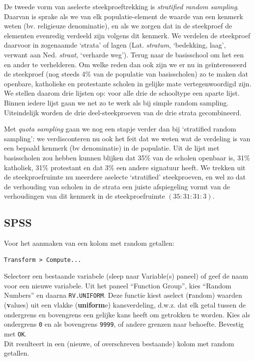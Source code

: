 \documentclass[
]{book}
\begin{document}
De tweede vorm van aselecte steekproeftrekking is
\emph{stratified random sampling}.
Daarvan is sprake als we van elk populatie-element de waarde
van een kenmerk weten (bv. religieuze denominatie), en als we zorgen dat
in de steekproef de elementen evenredig verdeeld zijn volgens dit
kenmerk. We verdelen de steekproef daarvoor in zogenaamde `strata' of
lagen (Lat. \emph{stratum}, `bedekking, laag', verwant aan Ned. \emph{straat},
`verharde weg'). Terug naar de basisschool om het een en ander te
verhelderen. Om welke reden dan ook zijn we er nu in geïnteresseerd de
steekproef (nog steeds 4\% van de populatie van basisscholen) zo te maken
dat openbare, katholieke en protestante scholen in gelijke mate
vertegenwoordigd zijn. We stellen daarom drie lijsten op: voor alle drie
de schooltype een aparte lijst. Binnen iedere lijst gaan we net zo te
werk als bij simple random sampling. Uiteindelijk worden de drie
deel-steekproeven van de drie strata gecombineerd.

Met \emph{quota sampling} gaan we nog een stapje verder dan bij `stratified
random sampling': we verdisconteren nu ook het feit dat we weten wat de
verdeling is van een bepaald kenmerk (bv denominatie) in de populatie.
Uit de lijst met basisscholen zou hebben kunnen blijken dat 35\% van de
scholen openbaar is, 31\% katholiek, 31\% protestant en dat 3\% een andere
signatuur heeft. We trekken uit de steekproefruimte nu meerdere aselecte
`stratified' steekproeven, en wel zo dat de verhouding van scholen in de
strata een juiste afspiegeling vormt van de verhoudingen van dit kenmerk
in de steekproefruimte \((35:31:31:3)\).

\hypertarget{spss}{%
\subsection{SPSS}\label{spss}}

Voor het aanmaken van een kolom met random getallen:

\begin{verbatim}
Transform > Compute...
\end{verbatim}

Selecteer een bestaande variabele (sleep naar Variable(s) paneel) of geef de naam voor een nieuwe variabele.
Uit het paneel ``Function Group'', kies ``Random Numbers'' en daarna \texttt{RV.UNIFORM}.
Deze functie kiest aselect (\textbf{r}andom) waarden (\textbf{v}alues) uit een vlakke (\textbf{uniform}e) kansverdeling, d.w.z. dat elk getal tussen de ondergrens en bovengrens een gelijke kans heeft om getrokken te worden.
Kies als ondergrens \texttt{0} en als bovengrens \texttt{9999}, of andere grenzen naar behoefte.
Bevestig met \texttt{OK}.\\
Dit resulteert in een (nieuwe, of overschreven bestaande) kolom met random getallen.
\end{document}
